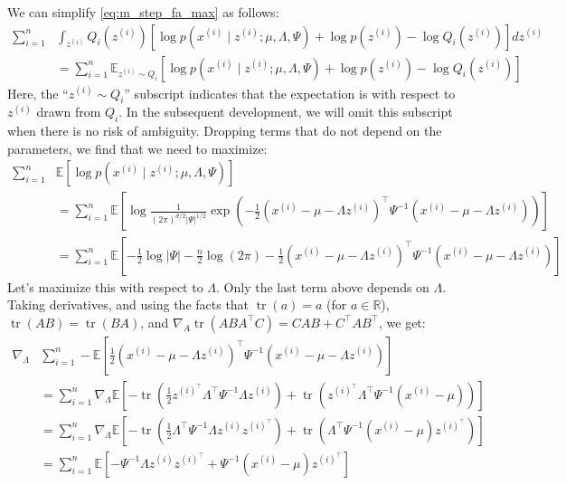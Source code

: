 We can simplify \cref{eq:m_step_fa_max} as follows:
\begin{align}
    \sum_{i=1}^n &\int_{z^{(i)}} Q_i(z^{(i)}) [\log p(x^{(i)} \mid z^{(i)}; \mu ,\Lambda , \Psi) + \log p(z^{(i)}) - \log Q_i(z^{(i)})] dz^{(i)}\\
    &= \sum_{i=1}^n \mathbb E_{z^{(i)} \sim Q_i} [\log p(x^{(i)} \mid z^{(i)}; \mu ,\Lambda , \Psi) + \log p(z^{(i)}) - \log Q_i(z^{(i)})]
\end{align}
Here, the ``$z^{(i)} \sim Q_i$'' subscript indicates that the expectation is with respect
to $z^{(i)}$ drawn from $Q_i$. In the subsequent development, we will omit this
subscript when there is no risk of ambiguity. Dropping terms that do not
depend on the parameters, we find that we need to maximize:
\begin{align*}
    \sum_{i=1}^n &\mathbb E[\log p(x^{(i)} \mid z^{(i)}; \mu ,\Lambda , \Psi)]\\
        &= \sum^n_{i=1} \mathbb E\left[\log \frac{1}{(2\pi)^{d/2}|\Psi|^{1/2}}\exp\left(-\frac{1}{2} (x^{(i)} - \mu - \Lambda z^{(i)})^\top\Psi^{-1}(x^{(i)} - \mu - \Lambda z^{(i)})\right)\right]\\
        &= \sum^n_{i=1} \mathbb E\left[-\frac{1}{2}\log |\Psi| - \frac{n}{2}\log(2\pi) -\frac{1}{2} (x^{(i)} - \mu - \Lambda z^{(i)})^\top\Psi^{-1}(x^{(i)} - \mu - \Lambda z^{(i)})\right]
\end{align*}
Let's maximize this with respect to $\Lambda$. Only the last term above depends
on $\Lambda$. Taking derivatives, and using the facts that $\operatorname{tr}(a)=a$ (for $a \in \mathbb R$),
$\operatorname{tr}(AB) = \operatorname{tr}(BA)$, and $\nabla_A\operatorname{tr}(ABA^\top C) = CAB + C^\top AB^\top$, we get:
\begin{align*}
    \nabla_\Lambda &\sum^n_{i=1} -\mathbb E\left[\frac{1}{2}(x^{(i)} - \mu - \Lambda z^{(i)})^\top\Psi^{-1}(x^{(i)} - \mu - \Lambda z^{(i)})\right]\\
        &= \sum^n_{i=1} \nabla_\Lambda \mathbb E\left[-\operatorname{tr}(\frac{1}{2} z^{(i)^\top}\Lambda^\top\Psi^{-1}\Lambda z^{(i)}) + \operatorname{tr}(z^{(i)^\top}\Lambda^\top\Psi^{-1}(x^{(i)} - \mu))\right]\\
        &= \sum^n_{i=1} \nabla_\Lambda \mathbb E\left[-\operatorname{tr}(\frac{1}{2} \Lambda^\top \Psi^{-1} \Lambda z^{(i)} z^{(i)^\top}) + \operatorname{tr}(\Lambda^\top\Psi^{-1}(x^{(i)} - \mu)z^{(i)^\top})\right]\\
        &= \sum^n_{i=1} \mathbb E\left[-\Psi^{-1} \Lambda z^{(i)} z^{(i)^\top} + \Psi^{-1}(x^{(i)} - \mu)z^{(i)^\top}\right]
\end{align*}
